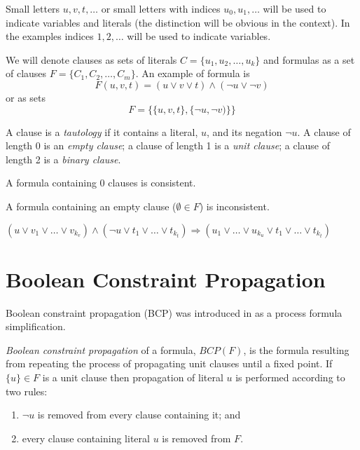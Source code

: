 Small letters $u, v, t, \ldots$ or small letters with indices $u_0,
u_1, \ldots$ will be used to indicate variables and literals (the
distinction will be obvious in the context). In the examples
indices $1, 2, \ldots$ will be used to indicate variables.

We will denote clauses as sets of literals $C = \{ u_1, u_2, \ldots,
u_k \}$ and formulas as a set of clauses $F = \{ C_1, C_2, \ldots,
C_m \} $.  An example of formula is
\[
F(u, v, t) = (u \lor v \lor t) \land (\neg u \lor \neg v)
\]
or as sets
\[
F = \{ \{u, v, t\}, \{\neg u, \neg v)\}\}
\]

\begin{mydef}
  A clause is a \emph{tautology} if it contains a literal, $u$, and its negation
  $\neg u$. A clause of length 0 is an \emph{empty clause}; a clause of length 1
  is a \emph{unit clause}; a clause of length 2 is a \emph{binary clause}. 
\end{mydef}

\begin{myprop}
  A formula containing 0 clauses is consistent.
\end{myprop}

\begin{myprop}
  A formula containing an empty clause ($\emptyset \in F$) is inconsistent.
\end{myprop}

\begin{mydef}[Resolution]
  \label{mydef:resolution}
  $(u \lor v_1 \lor \ldots \lor v_{k_v})
  \land (\neg u \lor t_1 \lor \ldots \lor t_{k_t})
  \Rightarrow (u_1 \lor \ldots \lor u_{k_u} \lor t_1 \lor \ldots \lor t_{k_t})$
\end{mydef}


\section{Boolean Constraint Propagation}
\label{sec:bcp}

Boolean constraint propagation (BCP) was introduced in
\cite{Davis:1960:CPQ:321033.321034} as a process formula
simplification.

\begin{mydef}
  \emph{Boolean constraint propagation} of a formula, $BCP(F)$, is
  the formula resulting from repeating the process of propagating
  unit clauses until a fixed point. If $\{ u \} \in F$ is a unit
  clause then propagation of literal
  $u$ is performed according to two rules:
  \begin{enumerate}
    \item $\neg u$ is removed from every clause containing it; and
    \item every clause containing literal $u$ is removed from $F$.
  \end{enumerate}
\end{mydef}

